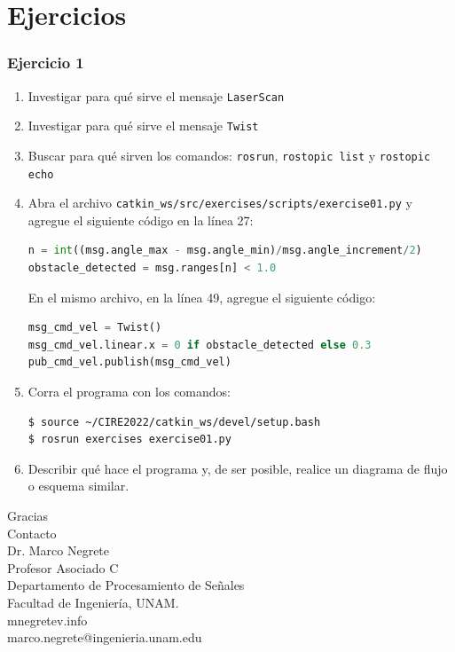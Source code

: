 \documentclass[10pt,spanish,aspectratio=1610]{beamer}
\begin{document}
\section{Ejercicios}
\begin{frame}[containsverbatim]\frametitle{Ejercicio 1}
  \begin{enumerate}
  \item Investigar para qué sirve el mensaje \texttt{LaserScan}
  \item Investigar para qué sirve el mensaje \texttt{Twist}
  \item Buscar para qué sirven los comandos: \texttt{rosrun}, \texttt{rostopic list} y \texttt{rostopic echo}
  \item Abra el archivo \texttt{catkin\_ws/src/exercises/scripts/exercise01.py} y agregue el siguiente código en la línea 27:
  \begin{lstlisting}[language=Python,firstnumber=27]
n = int((msg.angle_max - msg.angle_min)/msg.angle_increment/2)
obstacle_detected = msg.ranges[n] < 1.0
  \end{lstlisting}
  En el mismo archivo, en la línea 49, agregue el siguiente código:
  \begin{lstlisting}[language=Python,firstnumber=49]
msg_cmd_vel = Twist()
msg_cmd_vel.linear.x = 0 if obstacle_detected else 0.3
pub_cmd_vel.publish(msg_cmd_vel)
\end{lstlisting}
\item Corra el programa con los comandos:
  \begin{verbatim}
$ source ~/CIRE2022/catkin_ws/devel/setup.bash
$ rosrun exercises exercise01.py
\end{verbatim}
  \item Describir qué hace el programa y, de ser posible, realice un diagrama de flujo o esquema similar. 
  \end{enumerate}
\end{frame}



\begin{frame}
  \Huge{Gracias}
  \[\]
  \Large{Contacto}
  \[\]
  \large
  Dr. Marco Negrete\\
  Profesor Asociado C\\
  Departamento de Procesamiento de Señales\\
  Facultad de Ingeniería, UNAM.
\[\]
mnegretev.info\\
marco.negrete@ingenieria.unam.edu\\
\end{frame}
\end{document}
